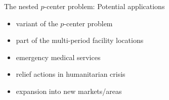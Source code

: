 \documentclass[utf8,aspectratio=169,ngerman,english]{beamer}
\renewcommand{\emph}[1]{\textcolor{jkuGreen}{#1}}
\begin{document}
\begin{frame}{The nested $p$-center problem: Potential applications}
\begin{itemize}
    \setlength\itemsep{1em}
    \item variant of the \emph{$p$-center problem}
    \item part of the \emph{multi-period} facility locations
    \item \emph{emergency} medical services 
    \item relief actions in \emph{humanitarian crisis}
    \item \emph{expansion} into new markets/areas
\end{itemize}
\end{frame}

\end{document}

